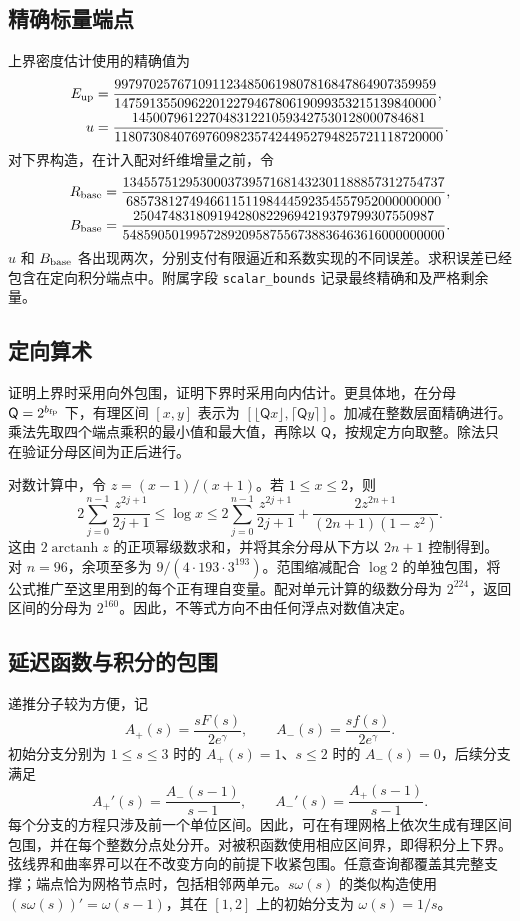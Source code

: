 \subsection{精确标量端点}
上界密度估计使用的精确值为
\begin{align}
 E_{\rm up}&=\frac{9979702576710911234850619807816847864907359959}
 {1475913550962201227946780619099353215139840000},
 \label{eq:current-E}\\
 u&=\frac{145007961227048312210593427530128000784681}
 {11807308407697609823574244952794825721118720000}.
 \label{eq:current-u}
\end{align}
对下界构造，在计入配对纤维增量之前，令
\begin{align}
 R_{\rm base}&=
 \frac{1345575129530003739571681432301188857312754737}
 {685738127494661151198444592354557952000000000},
 \label{eq:base-R}\\
 B_{\rm base}&=
 \frac{2504748318091942808229694219379799307550987}
 {5485905019957289209587556738836463616000000000}.
 \label{eq:base-B}
\end{align}
$u$ 和 $B_{\rm base}$ 各出现两次，分别支付有限逼近和系数实现的不同误差。求积误差已经包含在定向积分端点中。附属字段 \texttt{scalar\_bounds} 记录最终精确和及严格剩余量。

\subsection{定向算术}
证明上界时采用向外包围，证明下界时采用向内估计。更具体地，在分母 $\mathsf Q=2^{b_{\rm fp}}$ 下，有理区间 $[x,y]$ 表示为 $[\lfloor \mathsf Q x\rfloor,\lceil \mathsf Q y\rceil]$。加减在整数层面精确进行。乘法先取四个端点乘积的最小值和最大值，再除以 $\mathsf Q$，按规定方向取整。除法只在验证分母区间为正后进行。

对数计算中，令 $z=(x-1)/(x+1)$。若 $1\le x\le2$，则
\begin{equation}
 2\sum_{j=0}^{n-1}\frac{z^{2j+1}}{2j+1}
 \le\log x\le
 2\sum_{j=0}^{n-1}\frac{z^{2j+1}}{2j+1}
 +\frac{2z^{2n+1}}{(2n+1)(1-z^2)}.
 \label{num:log-enclosure}
\end{equation}
这由 $2\operatorname{arctanh}z$ 的正项幂级数求和，并将其余分母从下方以 $2n+1$ 控制得到。对 $n=96$，余项至多为 $9/(4\cdot193\cdot3^{193})$。范围缩减配合 $\log2$ 的单独包围，将公式推广至这里用到的每个正有理自变量。配对单元计算的级数分母为 $2^{224}$，返回区间的分母为 $2^{160}$。因此，不等式方向不由任何浮点对数值决定。

\subsection{延迟函数与积分的包围}
递推分子较为方便，记
\[
 A_+(s)=\frac{sF(s)}{2e^\gamma},\qquad
 A_-(s)=\frac{sf(s)}{2e^\gamma}.
\]
初始分支分别为 $1\le s\le3$ 时的 $A_+(s)=1$、$s\le2$ 时的 $A_-(s)=0$，后续分支满足
\[
 A_+'(s)=\frac{A_-(s-1)}{s-1},\qquad
 A_-'(s)=\frac{A_+(s-1)}{s-1}.
\]
每个分支的方程只涉及前一个单位区间。因此，可在有理网格上依次生成有理区间包围，并在每个整数分点处分开。对被积函数使用相应区间界，即得积分上下界。弦线界和曲率界可以在不改变方向的前提下收紧包围。任意查询都覆盖其完整支撑；端点恰为网格节点时，包括相邻两单元。$s\omega(s)$ 的类似构造使用 $(s\omega(s))'=\omega(s-1)$，其在 $[1,2]$ 上的初始分支为 $\omega(s)=1/s$。

